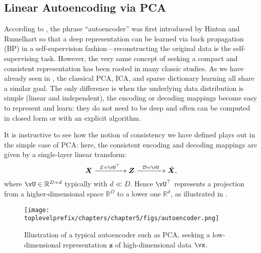 \documentclass[../../book-main.tex]{subfiles}
\begin{document}

\subsection{Linear Autoencoding via PCA}
According to \cite{Baldi2011}, the phrase ``autoencoder'' was first
introduced by Hinton and Rumelhart \cite{Rumelhart1986} so that a
deep representation can be learned via back propagation (BP) in a self-supervision fashion---reconstructing the original data is the self-supervising task. However, the very same concept of seeking a compact and consistent representation has been rooted in many classic studies. As we have already seen in , the classical PCA, ICA, and sparse dictionary learning all share a similar goal. The only difference is when the underlying data distribution is simple (linear and
independent), the encoding or decoding mappings become easy to represent and
learn: they do not need to be deep and often can be computed in closed form or
with an explicit algorithm.

It is instructive to see how the notion of consistency we have
defined plays out in the simple case of PCA:
here, the consistent encoding and decoding mappings are given by a single-layer
linear transform:
\begin{equation}
  \X \xrightarrow{\hspace{2mm} \mathcal{E} = \vU^\top \hspace{2mm}}
  \Z \xrightarrow{\hspace{2mm} \mathcal{D} = \vU \hspace{2mm}}   \hat{\X},
  \label{eqn:autoencoding-PCA-2}
\end{equation}
where $\vU \in \mathbb{R}^{D\times d}$ typically with $d\ll D$. Hence
$\vU^\top $ represents a projection from a higher-dimensional space
$\mathbb{R}^{D}$  to a lower one $\mathbb{R}^{d}$, as illustrated in
.
\begin{figure}
  \centering \texttt{[image: \\toplevelprefix/chapters/chapter5/figs/autoencoder.png]}
  \caption{Illustration of a typical autoencoder such as PCA, seeking
  a low-dimensional representation $\bm{z}$ of high-dimensional data $\vx$.}
  \label{fig:AE}
\end{figure}
\end{document}
